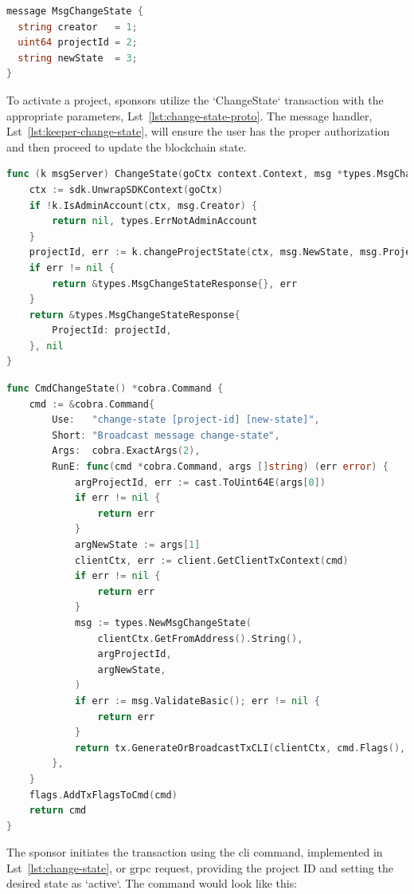 \begin{lstlisting}[language=go, caption=ChangeState protobuf definition,label={lst:change-state-proto}]
message MsgChangeState {
  string creator   = 1;
  uint64 projectId = 2;
  string newState  = 3;
}
\end{lstlisting}

To activate a project, sponsors utilize the `ChangeState` transaction with the appropriate parameters, Lst~\ref{lst:change-state-proto}. The message handler, Lst~\ref{lst:keeper-change-state}, will ensure the user has the proper authorization and then proceed to update the blockchain state.

\begin{lstlisting}[language=go, caption=Keeper implementation for ChangeState ,label={lst:keeper-change-state}]
func (k msgServer) ChangeState(goCtx context.Context, msg *types.MsgChangeState) (*types.MsgChangeStateResponse, error) {
	ctx := sdk.UnwrapSDKContext(goCtx)
	if !k.IsAdminAccount(ctx, msg.Creator) {
		return nil, types.ErrNotAdminAccount
	}
	projectId, err := k.changeProjectState(ctx, msg.NewState, msg.ProjectId)
	if err != nil {
		return &types.MsgChangeStateResponse{}, err
	}
	return &types.MsgChangeStateResponse{
		ProjectId: projectId,
	}, nil
}
\end{lstlisting}

\begin{lstlisting}[language=go, caption=Change State CLI Definition,label={lst:change-state}]
func CmdChangeState() *cobra.Command {
	cmd := &cobra.Command{
		Use:   "change-state [project-id] [new-state]",
		Short: "Broadcast message change-state",
		Args:  cobra.ExactArgs(2),
		RunE: func(cmd *cobra.Command, args []string) (err error) {
			argProjectId, err := cast.ToUint64E(args[0])
			if err != nil {
				return err
			}
			argNewState := args[1]
			clientCtx, err := client.GetClientTxContext(cmd)
			if err != nil {
				return err
			}
			msg := types.NewMsgChangeState(
				clientCtx.GetFromAddress().String(),
				argProjectId,
				argNewState,
			)
			if err := msg.ValidateBasic(); err != nil {
				return err
			}
			return tx.GenerateOrBroadcastTxCLI(clientCtx, cmd.Flags(), msg)
		},
	}
	flags.AddTxFlagsToCmd(cmd)
	return cmd
}
\end{lstlisting}

The sponsor initiates the transaction using the \gls{cli} command, implemented in Lst~\ref{lst:change-state}, or \gls{grpc} request, providing the project ID and setting the desired state as `active`. The command would look like this:

